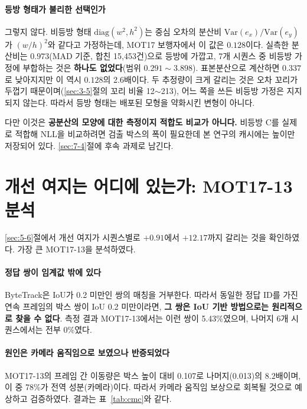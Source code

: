 \documentclass[12pt,a4paper,oneside]{report}
\begin{document}
\paragraph{등방 형태가 불리한 선택인가} 그렇지 않다. 비등방 형태 $\mathrm{diag}(w^2, h^2)$는 중심 오차의 분산비 $\mathrm{Var}(e_x)/\mathrm{Var}(e_y)$가 $(w/h)^2$와 같다고 가정하는데, MOT17 보행자에서 이 값은 $0.128$이다. 실측한 분산비는 $0.973$(MAD 기준, 합친 15{,}453건)으로 등방에 가깝고, 7개 시퀀스 중 비등방 가정에 부합하는 것은 \textbf{하나도 없었다}(범위 $0.291 \sim 3.898$). 표본분산으로 계산하면 $0.337$로 낮아지지만 이 역시 $0.128$의 2.6배이다. 두 추정량이 크게 갈리는 것은 오차 꼬리가 두껍기 때문이며(\ref{sec:3-5}절의 꼬리 비율 12$\sim$213), 어느 쪽을 쓰든 비등방 가정은 지지되지 않는다. 따라서 등방 형태는 배포된 모형을 약화시킨 변형이 아니다.

다만 이것은 \textbf{공분산의 모양에 대한 측정이지 적합도 비교가 아니다.} 비등방 C를 실제로 적합해 NLL을 비교하려면 검출 박스의 폭이 필요한데 본 연구의 캐시에는 높이만 저장되어 있다. \ref{sec:7-4}절에 후속 과제로 남긴다.

\section{개선 여지는 어디에 있는가: MOT17-13 분석}\label{sec:6-3}

\ref{sec:5-6}절에서 개선 여지가 시퀀스별로 $+0.91$에서 $+12.17$까지 갈리는 것을 확인하였다. 가장 큰 MOT17-13을 분석하였다.

\paragraph{정답 쌍이 임계값 밖에 있다} ByteTrack은 IoU가 0.2 미만인 쌍의 매칭을 거부한다. 따라서 동일한 정답 ID를 가진 연속 프레임의 박스 쌍이 IoU 0.2 미만이라면, \textbf{그 쌍은 IoU 기반 방법으로는 원리적으로 찾을 수 없다}. 측정 결과 MOT17-13에서는 이런 쌍이 5.43\%였으며, 나머지 6개 시퀀스에서는 전부 0\%였다.

\paragraph{원인은 카메라 움직임으로 보였으나 반증되었다} MOT17-13의 프레임 간 이동량은 박스 높이 대비 0.107로 나머지(0.013)의 $8.2$배이며, 이 중 78\%가 전역 성분(카메라)이다. 따라서 카메라 움직임 보상으로 회복될 것으로 예상하고 검증하였다. 결과는 표~\ref{tab:cmc}와 같다.
\end{document}
